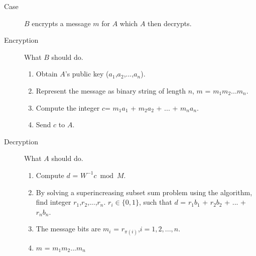 \documentclass{acm_proc_article-sp}
\begin{document}
    \begin{description}
    \item[Case] $B$ encrypts a message $m$ for $A$ which $A$ then decrypts.
    \item[Encryption] What $B$ should do.
    \begin{enumerate}
        \item Obtain $A$'s public key ($a_1$,$a_2$,...,$a_n$).
        \item Represent the message as binary string of length $n$, $m$ = $m_1m_2...m_n$.
        \item Compute the integer $c$= $m_1a_1$ + $m_2a_2$ + ... + $m_na_n$.
        \item Send $c$ to $A$.
    \end{enumerate}
    \item[Decryption] What $A$ should do.
    \begin{enumerate}
        \item Compute $d$ = $W^{-1}c \bmod M$.
        \item By solving a superincreasing subset sum problem using the algorithm, find integer $r_1$,$r_2$,...,$r_n$. $r_i \in \{0,1\}$, such that $d$ = $r_1b_1$ + $r_2b_2$ + ... + $r_nb_n$.
        \item The message bits are $m_i$ = $r_{\pi(i)}$,$i = 1,2,...,n$.
        \item $m$ = $m_1m_2...m_n$
    \end{enumerate}
    \end{description}
\end{document}
